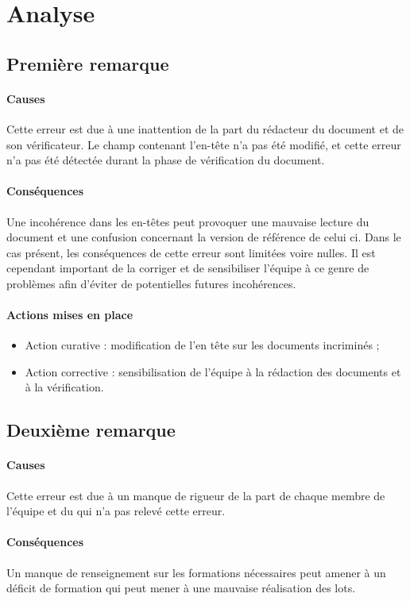 \documentclass[asi]{picInsa}
\begin{document}
\section{Analyse}
\subsection{Première remarque}
\paragraph*{Causes} Cette erreur est due à une inattention de la part du rédacteur du document et de son vérificateur. Le champ contenant l'en-tête n'a pas été modifié, et cette erreur n’a pas été détectée durant la phase de vérification du document.

\paragraph*{Conséquences} Une incohérence dans les en-têtes peut provoquer une mauvaise lecture du document et une confusion concernant la version de référence de celui ci. Dans le cas présent, les conséquences de cette erreur sont limitées voire nulles. Il est cependant important de la corriger et de sensibiliser l’équipe à ce genre de problèmes afin d’éviter de potentielles futures incohérences.

\paragraph*{Actions mises en place}
\begin{itemize}
\item Action curative : modification de l'en tête sur les documents incriminés ;
\item Action corrective : sensibilisation de l'équipe à la rédaction des documents et à la vérification.
\end{itemize}


\subsection{Deuxième remarque}
\paragraph*{Causes} Cette erreur est due à un manque de rigueur de la part de chaque membre de l'équipe et du \RQ{} qui n'a pas relevé cette erreur.

\paragraph*{Conséquences} Un manque de renseignement sur les formations nécessaires peut amener à un déficit de formation qui peut mener à une mauvaise réalisation des lots.
\end{document}
